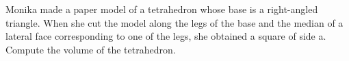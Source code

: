 Monika made a paper model of a tetrahedron whose base is a right-angled triangle. When she cut the model along the legs of the base and the median of a lateral face corresponding to one of the legs, she obtained a square of side a. Compute the volume of the tetrahedron.